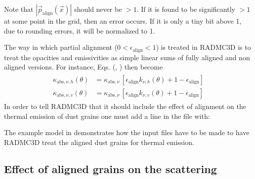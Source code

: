 \documentclass[letterpaper,10pt,english]{sphinxmanual}
\begin{document}
Note that \(|\vec p_{\mathrm{align}}(\vec x)|\) should never be
\(>1\). If it is found to be significantly \(>1\) at some point in the
grid, then an error occurs. If it is only a tiny bit above 1, due to rounding
errors, it will be normalized to 1.

The way in which partial alignment (\(0<\epsilon_{\mathrm{align}}<1\)) is
treated in RADMC\sphinxhyphen{}3D is to treat the opacities and emissivities as simple
linear sums of fully aligned and non aligned versions. For instance,
Eqs. (, ) then become
\begin{equation*}
\begin{split}\begin{split}
\kappa_{\mathrm{abs},\nu,h}(\theta) &= \kappa_{\mathrm{abs},\nu}\,[\epsilon_{\mathrm{align}}k_{\nu,h}(\theta)+1-\epsilon_{\mathrm{align}}] \\
\kappa_{\mathrm{abs},\nu,v}(\theta) &= \kappa_{\mathrm{abs},\nu}\,[\epsilon_{\mathrm{align}}k_{\nu,v}(\theta)+1-\epsilon_{\mathrm{align}}]
\end{split}\end{split}
\end{equation*}
In order to tell RADMC\sphinxhyphen{}3D that it should include the effect of alignment on the
thermal emission of dust grains one must add a line in the  file
with:

\begin{sphinxVerbatim}[commandchars=\\\{\}]
  
\end{sphinxVerbatim}

The example model in  demonstrates how the input
files have to be made to have RADMC\sphinxhyphen{}3D treat the aligned dust grains for thermal
emission.


\subsection{Effect of aligned grains on the scattering}
\label{\detokenize{dustradtrans:effect-of-aligned-grains-on-the-scattering}}\label{\detokenize{dustradtrans:sec-align-scat}}
\end{document}

